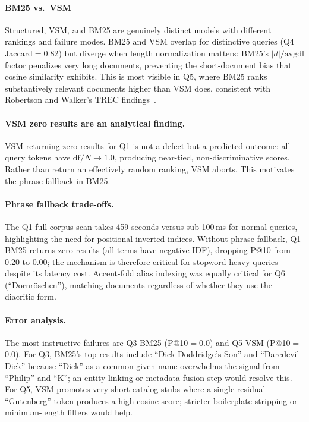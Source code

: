\documentclass[sigconf,nonacm]{acmart}
\begin{document}
\paragraph{BM25 vs.\ VSM}
Structured, VSM, and BM25 are genuinely distinct models with different
rankings and failure modes.  BM25 and VSM overlap for distinctive queries
(Q4 Jaccard$=$0.82) but diverge when length normalization matters:
BM25's $|d|/\text{avgdl}$ factor penalizes very long documents, preventing
the short-document bias that cosine similarity exhibits.  This is most visible
in Q5, where BM25 ranks substantively relevant documents higher than VSM
does, consistent with Robertson and Walker's TREC
findings~\cite{robertson1995trec3}.

\paragraph{VSM zero results are an analytical finding.}
VSM returning zero results for Q1 is not a defect but a predicted
outcome: all query tokens have $\text{df}/N \to 1.0$, producing
near-tied, non-discriminative scores.  Rather than return an
effectively random ranking, VSM aborts.  This motivates the phrase
fallback in BM25.

\paragraph{Phrase fallback trade-offs.}
The Q1 full-corpus scan takes 459 seconds versus sub-100\,ms for normal
queries, highlighting the need for positional inverted indices.  Without
phrase fallback, Q1 BM25 returns zero results (all terms have negative
IDF), dropping P@10 from 0.20 to 0.00; the mechanism is therefore critical
for stopword-heavy queries despite its latency cost.  Accent-fold alias
indexing was equally critical for Q6 (``Dornr\"oschen''), matching documents
regardless of whether they use the diacritic form.

\paragraph{Error analysis.}
The most instructive failures are Q3 BM25 (P@10$=$0.0) and Q5 VSM
(P@10$=$0.0).  For Q3, BM25's top results include ``Dick Doddridge's Son''
and ``Daredevil Dick'' because ``Dick'' as a common given name overwhelms
the signal from ``Philip'' and ``K''; an entity-linking or metadata-fusion
step would resolve this.  For Q5, VSM promotes very short catalog stubs
where a single residual ``Gutenberg'' token produces a high cosine score;
stricter boilerplate stripping or minimum-length filters would help.
\end{document}
